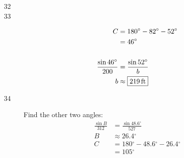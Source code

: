 \documentclass{exam}
\newcommand{\dg}{\ensuremath{^\circ}}
\begin{document}
\begin{description}
      \item[32] 

      \item[33] 
        \begin{align*}
          C & = 180 \dg - 82 \dg - 52 \dg \\
            & = 46 \dg \\
          \\
          \frac{\sin 46 \dg}{200} & = \frac{\sin 52 \dg}{b} \\
          b                       & \approx \boxed{ \unit[219]{ft} } \\
        \end{align*}

      \item[34] 
        Find the other two angles:
        \begin{align*}
          \frac{\sin B}{312} & = \frac{\sin 48.6 \dg}{527} \\
          B                  & \approx 26.4 \dg \\
          C                  & = 180 \dg - 48.6 \dg - 26.4 \dg \\
                             & = 105 \dg \\
        \end{align*}


\end{description}
\end{document}
